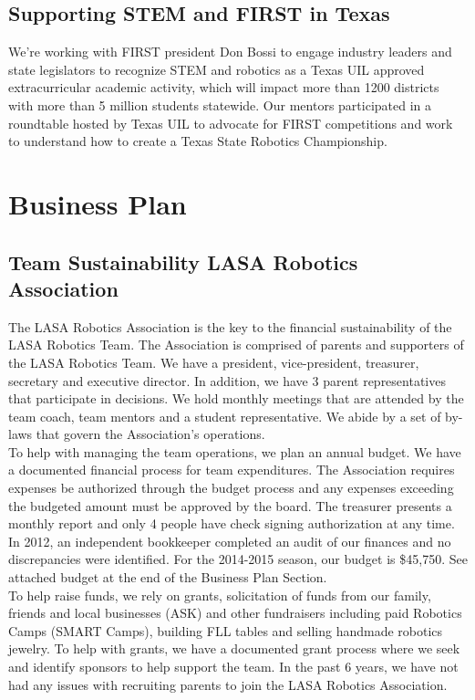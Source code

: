 \subsection{Supporting STEM and FIRST in Texas}
We’re working with FIRST president Don Bossi to engage industry leaders and state legislators to recognize STEM and robotics as a Texas UIL approved extracurricular academic activity, which will impact more than 1200 districts with more than 5 million students statewide.  Our mentors participated in a roundtable hosted by Texas UIL to advocate for FIRST competitions and work to understand how to create a Texas State Robotics Championship.

\section{Business Plan}
\subsection{Team Sustainability LASA Robotics Association}
The LASA Robotics Association is the key to the financial sustainability of the LASA Robotics Team.  The Association is comprised of parents and supporters of the LASA Robotics Team.   We have a president, vice-president, treasurer, secretary and executive director.  In addition, we have 3 parent representatives that participate in decisions.  We hold monthly meetings that are attended by the team coach, team mentors and a student representative. We abide by a set of by-laws that govern the Association’s operations.\\

To help with managing the team operations, we plan an annual budget. We have a documented financial process for team expenditures. The Association requires expenses be authorized through the budget process and any expenses exceeding the budgeted amount must be approved by the board. The treasurer presents a monthly report and only 4 people have check signing authorization at any time. In 2012, an independent bookkeeper completed an audit of our finances and no discrepancies were identified. For the 2014-2015 season, our budget is \$45,750.  See attached budget at the end of the Business Plan Section.\\

To help raise funds, we rely on grants, solicitation of funds from our family, friends and local businesses (ASK) and other fundraisers including paid Robotics Camps (SMART Camps), building FLL tables and selling handmade robotics jewelry.  To help with grants, we have a documented grant process where we seek and identify sponsors to help support the team. In the past 6 years, we have not had any issues with recruiting parents to join the LASA Robotics Association.

